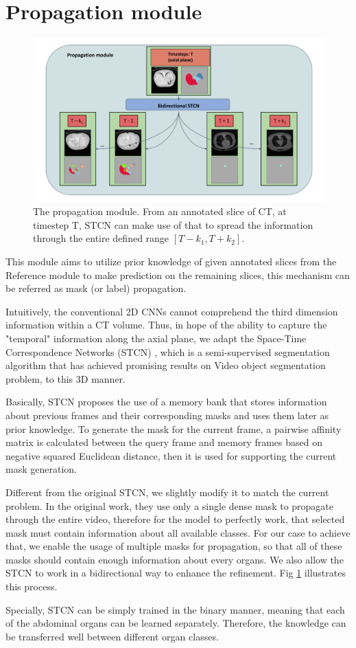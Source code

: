 \section{Propagation module}
\label{sec:propagation}
\begin{figure}[!htb]
    \centering
    \includegraphics[width=\textwidth]{content/resources/new_images/propagation.pdf}
    \caption{The propagation module. From an annotated slice of CT, at timestep T, STCN can make use of that to spread the information through the entire defined range $[T-k_1, T+k_2]$.}
    \label{fig:propagation}
\end{figure}

This module aims to utilize prior knowledge of given annotated slices from the Reference module to make prediction on the remaining slices, this mechanism can be referred as mask (or label) propagation.

Intuitively, the conventional 2D CNNs cannot comprehend the third dimension information within a CT volume. Thus, in hope of the ability to capture the "temporal" information along the axial plane, we adapt the Space-Time Correspondence Networks (STCN) \cite{stcn21cheng}, which is a semi-supervised segmentation algorithm that has achieved promising results on Video object segmentation problem, to this 3D manner. 

Basically, STCN proposes the use of a memory bank that stores information about previous frames and their corresponding masks and uses them later as prior knowledge. To generate the mask for the current frame, a pairwise affinity matrix is calculated between the query frame and memory frames based on negative squared Euclidean distance, then it is used for supporting the current mask generation. \cite{stcn21cheng}

Different from the original STCN, we slightly modify it to match the current problem. In the original work, they use only a single dense mask to propagate through the entire video, therefore for the model to perfectly work, that selected mask must contain information about all available classes. For our case to achieve that, we enable the usage of multiple masks for propagation, so that all of these masks should contain enough information about every organs. We also allow the STCN to work in a bidirectional way to enhance the refinement. Fig \ref{fig:propagation} illustrates this process.

Specially, STCN can be simply trained in the binary manner, meaning that each of the abdominal organs can be learned separately. Therefore, the knowledge can be transferred well between different organ classes.